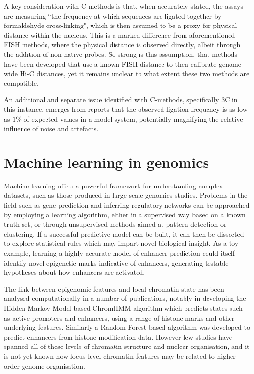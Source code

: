 \documentclass[a4paper,10pt,oneside]{book}
\begin{document}
A key consideration with C-methods is that, when accurately stated, the assays are measuring ``the frequency at which sequences are ligated together by formaldehyde cross-linking",\cite{Williamson2014} which is then assumed to be a proxy for physical distance within the nucleus. This is a marked difference from aforementioned FISH methods, where the physical distance is observed directly, albeit through the addition of non-native probes. So strong is this assumption, that methods have been developed that use a known FISH distance to then calibrate genome-wide Hi-C distances,\cite{Shavit2014} yet it remains unclear to what extent these two methods are compatible.

An additional and separate issue identified with C-methods, specifically 3C in this instance, emerges from reports that the observed ligation frequency is as low as $1\%$ of expected values in a model system,\cite{Gavrilov2013} potentially magnifying the relative influence of noise and artefacts.

\section{Machine learning in genomics}

Machine learning offers a powerful framework for understanding complex datasets, such as those produced in large-scale genomics studies.\cite{Libbrecht2015} Problems in the field such as gene prediction and inferring regulatory networks can be approached by employing a learning algorithm, either in a supervised way based on a known truth set, or through unsupervised methods aimed at pattern detection or clustering. If a successful predictive model can be built, it can then be dissected to explore statistical rules which may impart novel biological insight. As a toy example, learning a highly-accurate model of enhancer prediction could itself identify novel epigenetic marks indicative of enhancers, generating testable hypotheses about how enhancers are activated.

The link between epigenomic features and local chromatin state has been
analysed computationally in a number of publications, notably in
developing the
Hidden Markov Model-based ChromHMM\cite{Ernst2012} algorithm which predicts states such as active promoters and enhancers, using a
range of histone marks and other underlying features.\cite{Ernst2011} Similarly a Random Forest-based
algorithm was developed to predict enhancers from histone
modification data.\cite{Rajagopal2013} However few studies have spanned all of
these levels of chromatin structure and nuclear organisation, and it is not yet known how locus-level chromatin features may
be related to higher order genome organisation. \\
\end{document}
